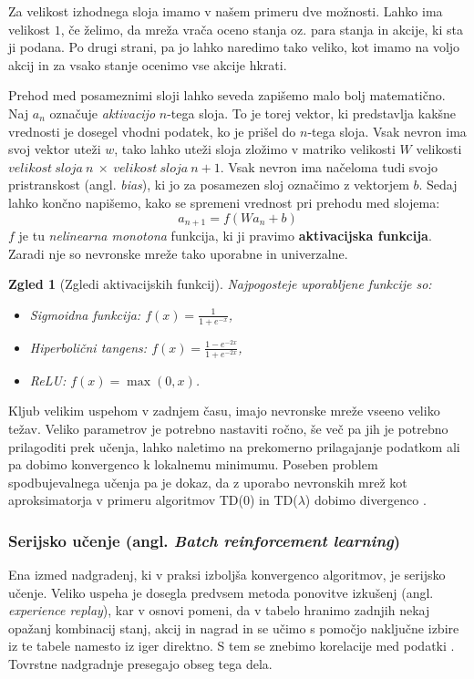 \documentclass[12pt,a4paper]{amsart}
\theoremstyle{definition} %
\theoremstyle{plain} %
\newtheorem{zgled}[definicija]{Zgled}
\begin{document}
Za velikost izhodnega sloja imamo v našem primeru dve možnosti. Lahko ima velikost $1$, če želimo, 
da mreža vrača oceno stanja oz. para stanja in akcije, ki sta ji podana. Po drugi strani, pa jo lahko 
naredimo tako veliko, kot imamo na voljo akcij in za vsako stanje ocenimo vse akcije hkrati. 

Prehod med posameznimi sloji lahko seveda zapišemo malo bolj matematično. Naj $a_n$ označuje 
\textit{aktivacijo} $n$-tega sloja. To je torej vektor, ki predstavlja kakšne vrednosti je dosegel
vhodni podatek, ko je prišel do $n$-tega sloja. Vsak nevron ima svoj vektor uteži $w$, tako lahko 
uteži sloja zložimo v matriko velikosti $W$ velikosti $velikost~sloja~n~\times~velikost~sloja~n + 1$.
Vsak nevron ima načeloma tudi svojo pristranskost (angl. \textit{bias}), ki jo za posamezen sloj 
označimo z vektorjem $b$. Sedaj lahko končno napišemo, kako se spremeni vrednost pri prehodu med 
slojema:
$$
a_{n+1} = f(W a_n + b)
$$
$f$ je tu \textit{nelinearna monotona} funkcija, ki ji pravimo \textbf{aktivacijska funkcija}. Zaradi 
nje so nevronske mreže tako uporabne in univerzalne. 

\begin{zgled}[Zgledi aktivacijskih funkcij]
    Najpogosteje uporabljene funkcije so:
    \begin{itemize}
        \item Sigmoidna funkcija: $f(x) = \frac{1}{1 + e^{-x}}$, 
        \item Hiperbolični tangens: $f(x) = \frac{1 - e^{-2x}}{1 + e^{-2x}}$,
        \item ReLU: $f(x) = \max(0, x)$.
    \end{itemize}
\end{zgled}

Kljub velikim uspehom v zadnjem času, imajo nevronske mreže vseeno veliko težav. Veliko parametrov je 
potrebno nastaviti ročno, še več pa jih je potrebno prilagoditi prek učenja, lahko naletimo na 
prekomerno prilagajanje podatkom ali pa dobimo konvergenco k lokalnemu minimumu.
Poseben problem spodbujevalnega učenja pa je dokaz, da z uporabo nevronskih mrež kot aproksimatorja 
v primeru algoritmov TD($0$) in TD($\lambda$) dobimo divergenco \cite{RLintro}.

\subsubsection{Serijsko učenje (angl. \textit{Batch reinforcement learning})}
Ena izmed nadgradenj, ki v praksi izboljša konvergenco algoritmov, je serijsko učenje. Veliko uspeha 
je dosegla predvsem metoda ponovitve izkušenj (angl. \textit{experience replay}), kar v osnovi pomeni, 
da v tabelo hranimo zadnjih nekaj opažanj kombinacij stanj, akcij in nagrad in se učimo s pomočjo 
naključne izbire iz te tabele namesto iz iger direktno. S tem se znebimo korelacije med podatki 
\cite{LecNotesSilver}. Tovrstne nadgradnje presegajo obseg tega dela.
\end{document}
